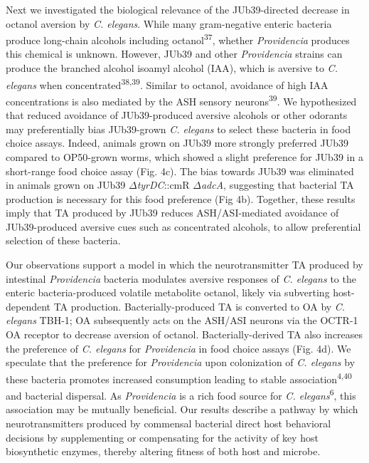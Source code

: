 \documentclass[11pt,]{article}
\begin{document}
Next we investigated the biological relevance of the JUb39-directed
decrease in octanol aversion by \textit{C. elegans}. While many
gram-negative enteric bacteria produce long-chain alcohols including
octanol\textsuperscript{37}, whether \textit{Providencia} produces this
chemical is unknown. However, JUb39 and other \textit{Providencia}
strains can produce the branched alcohol isoamyl alcohol (IAA), which is
aversive to \textit{C. elegans} when
concentrated\textsuperscript{38,39}. Similar to octanol, avoidance of
high IAA concentrations is also mediated by the ASH sensory
neurons\textsuperscript{39}. We hypothesized that reduced avoidance of
JUb39-produced aversive alcohols or other odorants may preferentially
bias JUb39-grown \textit{C. elegans} to select these bacteria in food
choice assays. Indeed, animals grown on JUb39 more strongly preferred
JUb39 compared to OP50-grown worms, which showed a slight preference for
JUb39 in a short-range food choice assay (Fig. 4c). The bias towards
JUb39 was eliminated in animals grown on JUb39
\(\Delta\)\textit{tyrDC}::cmR \(\Delta\)\textit{adcA}, suggesting that
bacterial TA production is necessary for this food preference (Fig 4b).
Together, these results imply that TA produced by JUb39 reduces
ASH/ASI-mediated avoidance of JUb39-produced aversive cues such as
concentrated alcohols, to allow preferential selection of these
bacteria.

Our observations support a model in which the neurotransmitter TA
produced by intestinal \emph{Providencia} bacteria modulates aversive
responses of \emph{C. elegans} to the enteric bacteria-produced volatile
metabolite octanol, likely via subverting host-dependent TA production.
Bacterially-produced TA is converted to OA by \emph{C. elegans} TBH-1;
OA subsequently acts on the ASH/ASI neurons via the OCTR-1 OA receptor
to decrease aversion of octanol. Bacterially-derived TA also increases
the preference of \emph{C. elegans} for \emph{Providencia} in food
choice assays (Fig. 4d). We speculate that the preference for
\emph{Providencia} upon colonization of \emph{C. elegans} by these
bacteria promotes increased consumption leading to stable
association\textsuperscript{4,40} and bacterial dispersal. As
\emph{Providencia} is a rich food source for \emph{C.
elegans}\textsuperscript{6}, this association may be mutually
beneficial. Our results describe a pathway by which neurotransmitters
produced by commensal bacterial direct host behavioral decisions by
supplementing or compensating for the activity of key host biosynthetic
enzymes, thereby altering fitness of both host and microbe.
\end{document}
